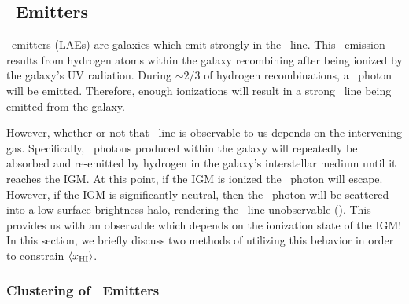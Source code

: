 \subsection{\lya\ Emitters}

\lya\ emitters (LAEs) are galaxies which emit strongly in the \lya\ line. This \lya\ emission results from hydrogen atoms within the galaxy recombining after being ionized by the galaxy's UV radiation. During $\sim2/3$ of hydrogen recombinations, a \lya\ photon will be emitted. Therefore,  enough ionizations will result in a strong \lya\ line being emitted from the galaxy. 


However, whether or not that \lya\ line is observable to us depends on the intervening gas. Specifically, \lya\ photons produced within the galaxy will repeatedly be absorbed and re-emitted by hydrogen in the galaxy's interstellar medium until it reaches the IGM. At this point, if the IGM is ionized the \lya\ photon will escape. However, if the IGM is significantly neutral, then the \lya\ photon will be scattered into a low-surface-brightness halo, rendering the \lya\ line unobservable (\citealt{finlator2012recent}). This provides us with an observable which depends on the ionization state of the IGM! In this section, we briefly discuss two methods of utilizing this behavior in order to constrain $\langle x_{\text{HI}}\rangle$.


\subsubsection{Clustering of \lya\ Emitters}

